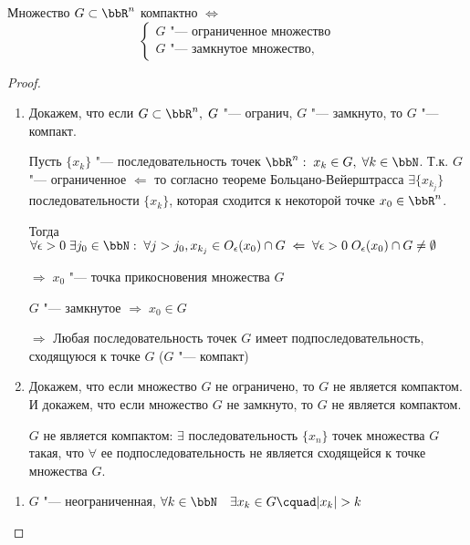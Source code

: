 \begin{thm}
Множество $G \subset \bbR^n$ компактно $\Leftrightarrow$
\begin{equation}
\begin{cases}
G \textit{ "--- ограниченное множество} \\
G \textit{ "--- замкнутое множество},
\end{cases}
\end{equation}
\end{thm}

\begin{proof}\leavevmode
\begin{enumerate}[wide, labelwidth=!, labelindent=\parindent]
\item
Докажем, что если $G \subset \bbR^n, \; G$ "--- огранич, $G$ "--- замкнуто, то $G$ "--- компакт.

Пусть $\{ x_k \}$ "--- последовательность точек $\bbR^n: \; x_k \in G, \; \forall k \in \bbN$. Т.к. $G$ "--- ограниченное $\Leftarrow$ то согласно теореме Больцано-Вейерштрасса $\exists \{ x_{k_j} \}$ последовательности $\{ x_k \}$, которая сходится к некоторой точке $x_0 \in \bbR^n$.

Тогда $\forall \epsilon > 0 \; \exists j_0 \in \bbN: \; \forall j > j_0, x_{k_j} \in O_\epsilon(x_0) \cap G \; \Leftarrow \; \forall \epsilon > 0 \; O_\epsilon(x_0) \cap G \not= \emptyset$

$\Rightarrow \; x_0$ "--- точка прикосновения множества $G$

$G$ "--- замкнутое $\Rightarrow \; x_0 \in G$

$\Rightarrow$ Любая последовательность точек $G$ имеет подпоследовательность, сходящуюся к точке $G$ ($G$ "--- компакт)

\item

Докажем, что если множество $G$ не ограничено, то $G$ не является компактом. И докажем, что если множество $G$ не замкнуто, то $G$ не является компактом.

$G$ не является компактом: $\exists$ последовательность $\{ x_n \}$ точек множества $G$ такая, что $\forall$ ее подпоследовательность не является сходящейся к точке множества $G$. 
\end{enumerate}

\begin{enumerate}[wide, labelwidth=!, labelindent=\parindent]
\item

$G$ "--- неограниченная, $\forall k \in \bbN \quad \exists x_k \in G\cquad |x_k| > k$


\end{enumerate}
\end{proof}
